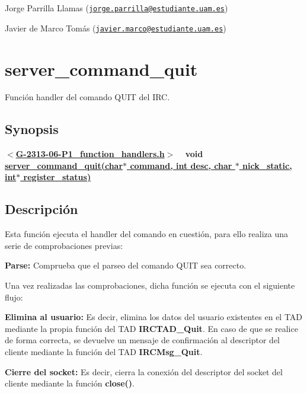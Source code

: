 \begin{DoxyItemize}
\item Jorge Parrilla Llamas (\href{mailto:jorge.parrilla@estudiante.uam.es}{\tt jorge.\+parrilla@estudiante.\+uam.\+es}) 
\item Javier de Marco Tomás (\href{mailto:javier.marco@estudiante.uam.es}{\tt javier.\+marco@estudiante.\+uam.\+es}) 
\end{DoxyItemize}\hypertarget{server_command_quit}{}\section{server\+\_\+command\+\_\+quit}\label{server_command_quit}
Función handler del comando Q\+U\+IT del I\+RC.\hypertarget{server_command_quit_synopsis_quit}{}\subsection{Synopsis}\label{server_command_quit_synopsis_quit}
{ {\bfseries $<$\hyperlink{G-2313-06-P1__function__handlers_8h}{G-\/2313-\/06-\/\+P1\+\_\+function\+\_\+handlers.\+h}$>$} ~\newline
 {\bfseries void \hyperlink{G-2313-06-P1__function__handlers_8c_a3df99a1f2cefc2d91d65cbb6dd555f96}{server\+\_\+command\+\_\+quit(char$\ast$ command, int desc, char $\ast$ nick\+\_\+static, int$\ast$ register\+\_\+status)}} } \hypertarget{server_command_quit_descripcion_quit}{}\subsection{Descripción}\label{server_command_quit_descripcion_quit}
Esta función ejecuta el handler del comando en cuestión, para ello realiza una serie de comprobaciones previas\+:


\begin{DoxyItemize}
\item {\bfseries Parse\+:} Comprueba que el parseo del comando Q\+U\+IT sea correcto. 
\end{DoxyItemize}

Una vez realizadas las comprobaciones, dicha función se ejecuta con el siguiente flujo\+:


\begin{DoxyItemize}
\item {\bfseries Elimina al usuario\+:} Es decir, elimina los datos del usuario existentes en el T\+AD mediante la propia función del T\+AD {\bfseries I\+R\+C\+T\+A\+D\+\_\+\+Quit}. En caso de que se realice de forma correcta, se devuelve un mensaje de confirmación al descriptor del cliente mediante la función del T\+AD {\bfseries I\+R\+C\+Msg\+\_\+\+Quit}.  
\item {\bfseries Cierre del socket\+:} Es decir, cierra la conexión del descriptor del socket del cliente mediante la función {\bfseries close()}.  
\end{DoxyItemize}

